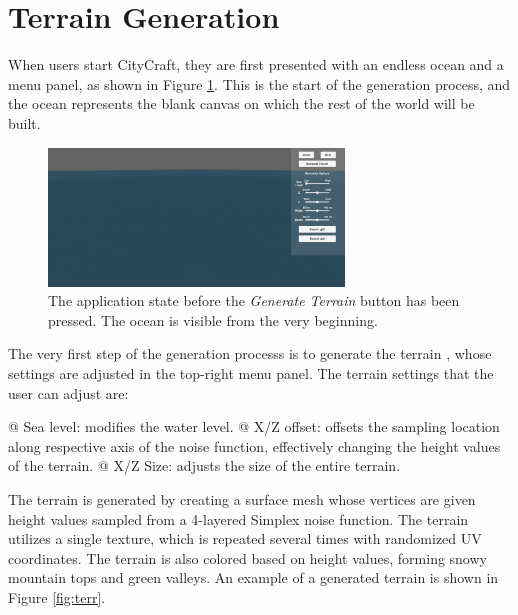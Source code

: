 \section{Terrain Generation}

When users start CityCraft, they are first presented with an endless ocean and a menu panel, as shown in Figure \ref{fig:no_terr}.
This is the start of the generation process, and the ocean represents the blank canvas on which the rest of the world will be built.

\begin{figure}[H]
  \centering

  \includegraphics[width=0.7\textwidth]{figure/terrain_not_generated.png}
  \caption{The application state before the \textit{Generate Terrain} button has been pressed. The ocean is visible from the very beginning.}

  \label{fig:no_terr}
\end{figure}

The very first step of the generation processs is to generate the terrain
, whose settings are adjusted in the top-right menu panel.
The terrain settings that the user can adjust are:
\begin{easylist}
  @ Sea level: modifies the water level.
  @ X/Z offset: offsets the sampling location along respective axis of the noise function, effectively changing the height values of the terrain.
  @ X/Z Size: adjusts the size of the entire terrain.
\end{easylist}

The terrain is generated by creating a surface mesh whose vertices are given height values sampled from a 4-layered Simplex noise function.
The terrain utilizes a single texture, which is repeated several times with randomized UV coordinates.
The terrain is also colored based on height values, forming snowy mountain tops and green valleys.
An example of a generated terrain is shown in Figure \ref{fig:terr}.

